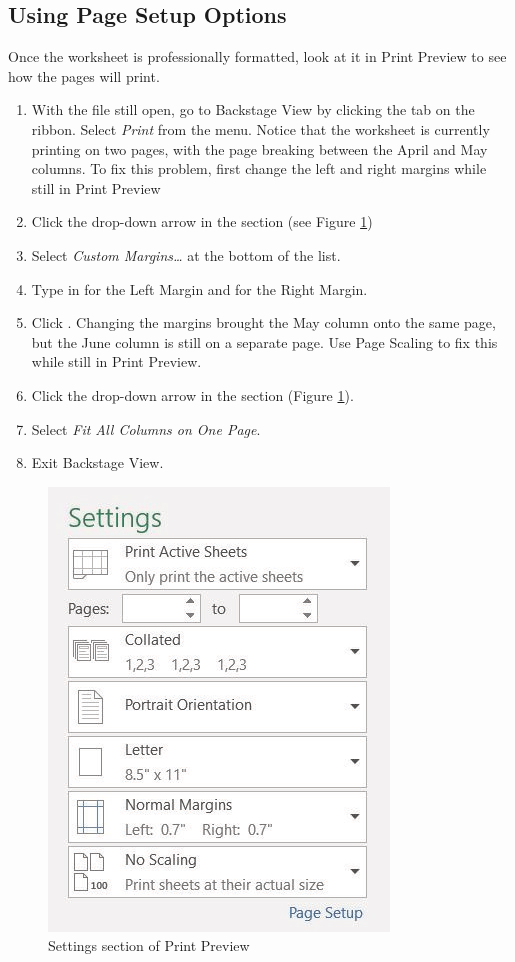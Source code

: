 \subsection{Using Page Setup Options}

Once the worksheet is professionally formatted, look at it in Print Preview to see how the pages will print.

\begin{enumerate}
	\item With the  file still open, go to Backstage View by clicking the  tab on the ribbon. Select \textit{Print} from the menu. Notice that the worksheet is currently printing on two pages, with the page breaking between the April and May columns. To fix this problem, first change the left and right margins while still in Print Preview
	\item Click the  drop-down arrow in the  section (see Figure \ref{02:fig43})
	\item Select \textit{Custom Margins…} at the bottom of the list.
	\item Type in  for the Left Margin and  for the Right Margin.
	\item Click . Changing the margins brought the May column onto the same page, but the June column is still on a separate page. Use Page Scaling to fix this while still in Print Preview.
	\item Click the  drop-down arrow in the  section (Figure \ref{02:fig43}).
	\item Select \textit{Fit All Columns on One Page}.
	\item Exit Backstage View.
\end{enumerate}

\begin{figure}[H]
	\centering
	\includegraphics[width=\maxwidth{.95\linewidth}]{gfx/ch02_fig43}
	\caption{Settings section of Print Preview}
	\label{02:fig43}
\end{figure}

